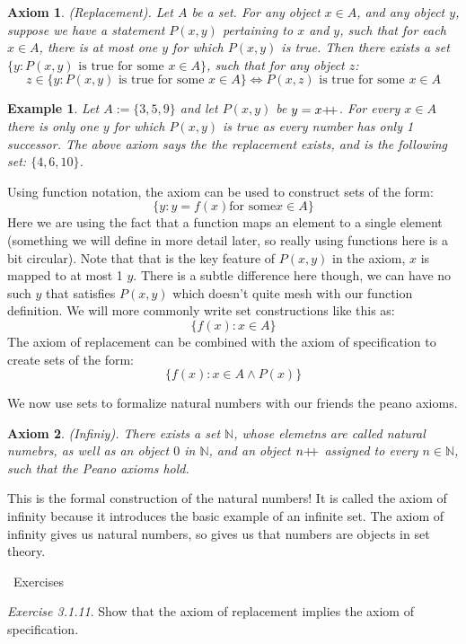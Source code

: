 \documentclass{article}
\newtheorem{example}{Example}[subsection]
\newtheorem{axiom}{Axiom}[section]
\newcommand{\N}{\mathbb{N}}
\newcommand{\exercisesline}{	%
    \begin{center}
    \textemdash\ Exercises\ \textemdash
    \end{center}
}
\newcommand{\pp}{\mathbin{+\mkern-5mu+}}
\let\it\textit
\begin{document}
\begin{axiom}
	(Replacement). Let $A$ be a set. For any object $x \in A$, and 
	any object $y$, suppose we have a statement 
	$P(x,y)$ pertaining to $x$ and $y$, such that for each 
	$x \in A$, there is at most one $y$ for which $P(x,y)$ is true.
	Then there exists a set $\{y : P(x,y) \text{ is true for some } x \in A\}$, 
	such that for any object $z$:
	$$
	z \in \{y : P(x,y) \text{ is true for some } x \in A\} \iff P(x,z) \text{ is true for some } x \in A
	$$
\end{axiom}

\begin{example}
	Let $A := \{3,5,9\}$ and let $P(x,y)$ be $y = x\pp$. For every $x\in A$ 
	there is only one $y$ for which $P(x,y)$ is true as every number 
	has only 1 successor. The above axiom says the the replacement exists,
	and is the following set: $\{4,6,10\}$.
\end{example}

Using function notation, the axiom can be used to construct sets of the form: 
$$
\{y : y = f(x) \text{for some} x \in A\}
$$
Here we are using the fact that a function maps an element to a single 
element (something we will define in more detail later, so really 
using functions here is a bit circular). Note that that is the 
key feature of $P(x,y)$ in the axiom, $x$ is mapped to at most 1 $y$.
There is a subtle difference here though, we can have no such $y$ 
that satisfies $P(x,y)$ which doesn't quite mesh with our function 
definition.
We will more commonly write set constructions like this as:
$$
\{ f(x) : x \in A\}
$$
The axiom of replacement can be combined with the axiom of specification 
to create sets of the form:
$$
\{ f(x) : x \in A \land P(x)\}
$$

We now use sets to formalize natural numbers with our friends
the peano axioms.
\begin{axiom}
	(Infiniy). There exists a set $\N$, whose elemetns are called 
	natural numebrs, as well as an object $0$ in $\N$, and 
	an object $n \pp$ assigned to every $n \in \N$, such that 
	the Peano axioms hold.
\end{axiom}
This is the formal construction of the natural numbers! It is 
called the axiom of infinity because it introduces the basic example 
of an infinite set. The axiom of infinity gives us natural numbers, 
so gives us that numbers are objects in set theory.

\exercisesline

\it{Exercise 3.1.11}. Show that the axiom of replacement implies the
axiom of specification. 
\end{document}
